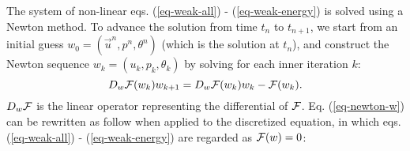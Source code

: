 The system of non-linear eqs. (\ref{eq-weak-all}) - (\ref{eq-weak-energy}) is solved using a Newton method. To advance the solution from time $t_n$ to $t_{n+1}$, we start from an initial guess $w_0 = (\vec{u}^{n}, p^{n}, \theta^{n})$ (which is the solution at $t_n$), and construct the Newton sequence $w_k = (u_k, p_k, \theta_k)$ by solving for each inner iteration $k$:
\begin{equation}
D_w{\cal F} (w_k ) w_{k+1} = D_w{\cal F}(w_k) w_k -  {\cal F}(w_k).
\label{eq-newton-w}
\end{equation}
$D_w{\cal F}$ is the linear operator representing the differential of $\cal F$.
Eq. (\ref{eq-newton-w}) can be rewritten as follow when applied to the discretized equation, in which eqs. (\ref{eq-weak-all}) - (\ref{eq-weak-energy}) are regarded as ${\cal F}(w) = 0$:
